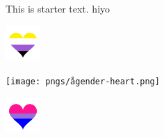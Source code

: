 \documentclass{article}
\begin{document}
This is starter text.  hiyo





\includegraphics[width=0.1\textwidth]{pngs/enby-heart.png}

\texttt{[image: pngs/ågender-heart.png]}

\includegraphics[width=0.1\textwidth]{pngs 1/bi heart.png}
\end{document}
